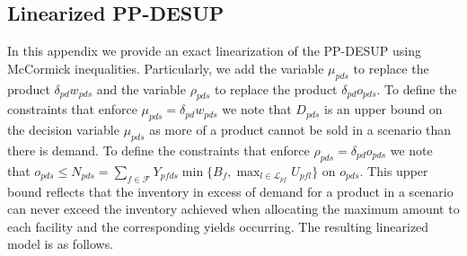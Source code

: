\documentclass[12pt]{article}
\theoremstyle{thmstylethree}%
\begin{document}
\begin{appendices}
\section{Linearized PP-DESUP} \label{app:linearized_pp_desup}


  In this appendix we provide an exact linearization of the PP-DESUP using McCormick inequalities. Particularly, we add the variable $\mu_{pds}$ to replace the product $\delta_{pd}w_{pds}$ and the variable $\rho_{pds}$ to replace the product $\delta_{pd}o_{pds}$. To define the constraints that enforce $\mu_{pds}=\delta_{pd}w_{pds}$ we note that $D_{pds}$ is an upper bound on the decision variable $\mu_{pds}$ as more of a product cannot be sold in a scenario than there is demand.
  To define the constraints that enforce $\rho_{pds}=\delta_{pd}o_{pds}$ we note that $o_{pds}\leq N_{pds}=\sum_{f\in\mathcal{F}}Y_{pfds}\min\{B_{f},\max_{l\in\mathcal{L}_{pf}}U_{pfl}\}$ on $o_{pds}.$ This upper bound reflects that the inventory in excess of demand for a product in a scenario can never exceed the inventory achieved when allocating the maximum amount to each facility and the corresponding yields occurring. 
The resulting linearized model is as follows.



\end{appendices}
\end{document}

